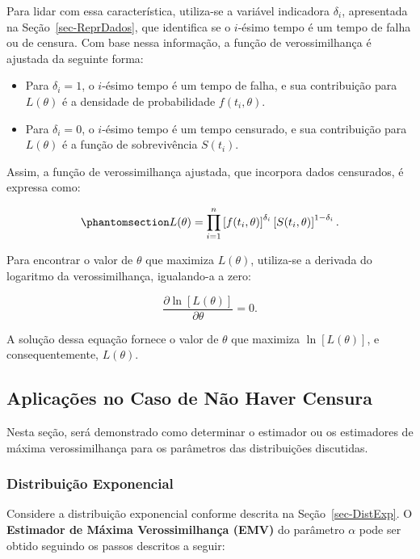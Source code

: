 \documentclass[
  12pt,
  letterpaper,
  DIV=11,
  numbers=noendperiod]{scrreprt}
\providecommand{\tightlist}{%
  \setlength{\itemsep}{0pt}\setlength{\parskip}{0pt}}\usepackage{longtable,booktabs,array}
\begin{document}
Para lidar com essa característica, utiliza-se a variável indicadora
\(\delta_{i}\), apresentada na Seção~\ref{sec-ReprDados}, que identifica
se o \(i\)-ésimo tempo é um tempo de falha ou de censura. Com base nessa
informação, a função de verossimilhança é ajustada da seguinte forma:

\begin{itemize}
\tightlist
\item
  Para \(\delta_{i} = 1\), o \(i\)-ésimo tempo é um tempo de falha, e
  sua contribuição para \(L(\theta)\) é a densidade de probabilidade
  \(f(t_{i}, \theta)\).
\item
  Para \(\delta_i = 0\), o \(i\)-ésimo tempo é um tempo censurado, e sua
  contribuição para \(L(\theta)\) é a função de sobrevivência
  \(S(t_i)\).
\end{itemize}

Assim, a função de verossimilhança ajustada, que incorpora dados
censurados, é expressa como:

\begin{equation}\phantomsection\label{eq-verossilGeneric}{
L(\theta) = \prod_{i = 1}^{n} \left[ f(t_{i}, \theta) \right]^{\delta_i} \left[ S(t_{i}, \theta) \right]^{1 - \delta_{i}}.
}\end{equation}

Para encontrar o valor de \(\theta\) que maximiza \(L(\theta)\),
utiliza-se a derivada do logaritmo da verossimilhança, igualando-a a
zero:

\[
\frac{\partial \ln [L(\theta)]}{\partial \theta} = 0.
\]

A solução dessa equação fornece o valor de \(\theta\) que maximiza
\(\ln [L(\theta)]\), e consequentemente, \(L(\theta)\).

\subsection{Aplicações no Caso de Não Haver
Censura}\label{aplicauxe7uxf5es-no-caso-de-nuxe3o-haver-censura}

Nesta seção, será demonstrado como determinar o estimador ou os
estimadores de máxima verossimilhança para os parâmetros das
distribuições discutidas.

\subsubsection{Distribuição
Exponencial}\label{distribuiuxe7uxe3o-exponencial}

Considere a distribuição exponencial conforme descrita na
Seção~\ref{sec-DistExp}. O \textbf{Estimador de Máxima Verossimilhança
(EMV)} do parâmetro \(\alpha\) pode ser obtido seguindo os passos
descritos a seguir:
\end{document}
